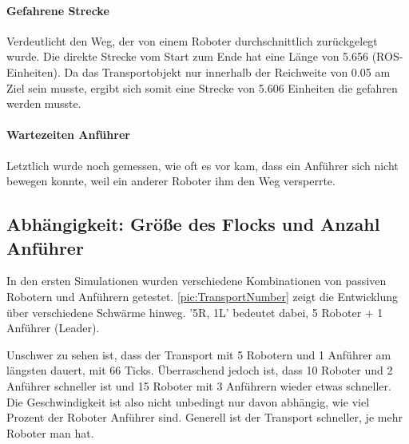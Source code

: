 \paragraph*{Gefahrene Strecke}
Verdeutlicht den Weg, der von einem Roboter durchschnittlich zurückgelegt wurde. Die direkte Strecke vom Start zum Ende hat eine Länge von 5.656 (ROS-Einheiten). Da das Transportobjekt nur innerhalb der Reichweite von 0.05 am Ziel sein musste, ergibt sich somit eine Strecke von 5.606 Einheiten die gefahren werden musste.

\paragraph*{Wartezeiten Anführer}
Letztlich wurde noch gemessen, wie oft es vor kam, dass ein Anführer sich nicht bewegen konnte, weil ein anderer Roboter ihm den Weg versperrte.

\subsection*{Abhängigkeit: Größe des Flocks und Anzahl Anführer}

In den ersten Simulationen wurden verschiedene Kombinationen von passiven Robotern und Anführern getestet. \autoref{pic:TransportNumber} zeigt die Entwicklung über verschiedene Schwärme hinweg. '5R, 1L' bedeutet dabei, 5 Roboter + 1 Anführer (Leader).

Unschwer zu sehen ist, dass der Transport mit 5 Robotern und 1 Anführer am längsten dauert, mit 66 Ticks. Überraschend jedoch ist, dass 10 Roboter und 2 Anführer schneller ist und 15 Roboter mit 3 Anführern wieder etwas schneller. Die Geschwindigkeit ist also nicht unbedingt nur davon abhängig, wie viel Prozent der Roboter Anführer sind. Generell ist der Transport schneller, je mehr Roboter man hat.

\newcommand{\sectionTransportPictureWidth}{7.5cm}
\newcommand{\sectionTransportPictureHeight}{3.5cm}

